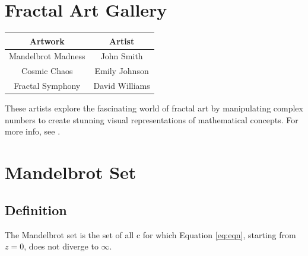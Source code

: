 \documentclass{article}
\begin{document}
\section{Fractal Art Gallery}
\begin{table}[htbp]
  \centering
  \begin{tabular}{|c|c|}
    \hline
    \textbf{Artwork} & \textbf{Artist} \\
    \hline
    Mandelbrot Madness & John Smith \\
    Cosmic Chaos & Emily Johnson \\
    Fractal Symphony & David Williams \\
    \hline
  \end{tabular}
\end{table}
These artists explore the fascinating world of fractal art by manipulating complex numbers to create stunning visual representations of mathematical concepts. For more info, see \cite{link}.

\section{Mandelbrot Set}
\subsection{Definition}
The Mandelbrot set is the set of all c for which Equation \ref{eq:eqn}, starting from $z = 0$, does not diverge to $\infty$.
\end{document}
